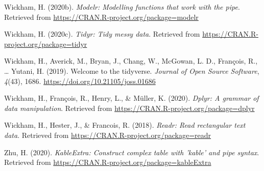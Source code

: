 \documentclass[
  english,
  jou,floatsintext]{apa6}
\begin{document}
\leavevmode\hypertarget{ref-R-modelr}{}%
Wickham, H. (2020b). \emph{Modelr: Modelling functions that work with the pipe}. Retrieved from \url{https://CRAN.R-project.org/package=modelr}

\leavevmode\hypertarget{ref-R-tidyr}{}%
Wickham, H. (2020c). \emph{Tidyr: Tidy messy data}. Retrieved from \url{https://CRAN.R-project.org/package=tidyr}

\leavevmode\hypertarget{ref-R-tidyverse}{}%
Wickham, H., Averick, M., Bryan, J., Chang, W., McGowan, L. D., François, R., \ldots{} Yutani, H. (2019). Welcome to the tidyverse. \emph{Journal of Open Source Software}, \emph{4}(43), 1686. \url{https://doi.org/10.21105/joss.01686}

\leavevmode\hypertarget{ref-R-dplyr}{}%
Wickham, H., François, R., Henry, L., \& Müller, K. (2020). \emph{Dplyr: A grammar of data manipulation}. Retrieved from \url{https://CRAN.R-project.org/package=dplyr}

\leavevmode\hypertarget{ref-R-readr}{}%
Wickham, H., Hester, J., \& Francois, R. (2018). \emph{Readr: Read rectangular text data}. Retrieved from \url{https://CRAN.R-project.org/package=readr}

\leavevmode\hypertarget{ref-R-kableExtra}{}%
Zhu, H. (2020). \emph{KableExtra: Construct complex table with 'kable' and pipe syntax}. Retrieved from \url{https://CRAN.R-project.org/package=kableExtra}

\endgroup
\end{document}
